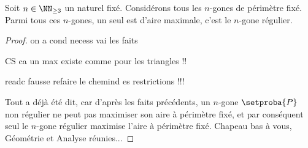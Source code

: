 

\begin{fact}
	Soit $n \in \NN_{\geq3}$ un naturel fixé.
	Considérons tous les $n$-gones de périmètre fixé. Parmi tous ces $n$-gones, un seul est d'aire maximale, c'est le $n$-gone régulier.
\end{fact}


\begin{proof}
	on a cond necess vai les faits
	
	CS ca un max existe comme pour les triangles
	!!
	
	
	readc fausse
	refaire le chemind es restrictions !!!
	
	Tout a déjà été dit, car d'après les faits précédents, un $n$-gone $\setproba{P}$ non régulier ne peut pas maximiser son aire à périmètre fixé, et par conséquent seul le $n$-gone régulier maximise l'aire à périmètre fixé. Chapeau bas à vous, Géométrie et Analyse réunies...
\end{proof}
